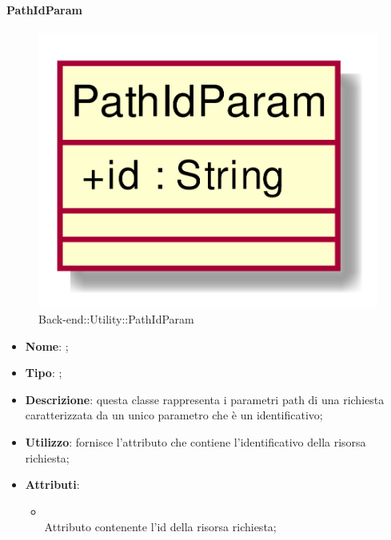 \hypertarget{PathIdParam_label}{\paragraph{PathIdParam}}
\begin{figure}[h]
	\centering
	\includegraphics[width=\textwidth,height=\textheight,keepaspectratio]{images/ClassPathIdParam.png}
	\caption{Back-end::Utility::PathIdParam}
\end{figure}
\begin{itemize}
	\item \textbf{Nome}: ;
	\item \textbf{Tipo}: ;
	\item \textbf{Descrizione}: questa classe rappresenta i parametri path di una richiesta caratterizzata da un unico parametro che è un identificativo;
	\item \textbf{Utilizzo}: fornisce l'attributo che contiene l'identificativo della risorsa richiesta;
	\item \textbf{Attributi}:
	\begin{itemize}
		\item[]  \\
		Attributo contenente l'id della risorsa richiesta;
	\end{itemize}
\end{itemize}
\FloatBarrier

